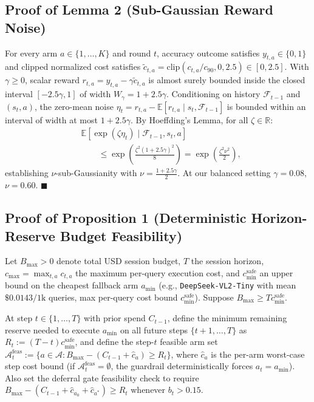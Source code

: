 \documentclass[10pt,twocolumn,letterpaper]{article}
\begin{document}
\subsection{Proof of Lemma 2 (Sub-Gaussian Reward Noise)}
For every arm $a \in \{1,\dots,K\}$ and round $t$, accuracy outcome satisfies $y_{t,a} \in \{0,1\}$ and clipped normalized cost satisfies $\tilde{c}_{t,a} = \text{clip}(c_{t,a}/c_{90}, 0, 2.5) \in [0, 2.5]$. With $\gamma \ge 0$, scalar reward $r_{t,a} = y_{t,a} - \gamma \tilde{c}_{t,a}$ is almost surely bounded inside the closed interval $[-2.5\gamma, 1]$ of width $W_\gamma = 1 + 2.5\gamma$. Conditioning on history $\mathcal{F}_{t-1}$ and $(s_t, a)$, the zero-mean noise $\eta_t = r_{t,a} - \mathbb{E}[r_{t,a} \mid s_t, \mathcal{F}_{t-1}]$ is bounded within an interval of width at most $1 + 2.5\gamma$. By Hoeffding's Lemma, for all $\zeta \in \mathbb{R}$:
\begin{align*}
&\mathbb{E}\left[\exp(\zeta \eta_t) \mid \mathcal{F}_{t-1}, s_t, a\right] \\
&\qquad \le \exp\!\left(\frac{\zeta^2 (1 + 2.5\gamma)^2}{8}\right) = \exp\!\left(\frac{\zeta^2 \nu^2}{2}\right),
\end{align*}
establishing $\nu$-sub-Gaussianity with $\nu = \frac{1 + 2.5\gamma}{2}$. At our balanced setting $\gamma{=}0.08$, $\nu = 0.60$. \hfill $\blacksquare$

\subsection{Proof of Proposition 1 (Deterministic Horizon-Reserve Budget Feasibility)}
Let $B_{\max} > 0$ denote total USD session budget, $T$ the session horizon, $c_{\max} = \max_{t,a} c_{t,a}$ the maximum per-query execution cost, and $c_{\min}^{\text{safe}}$ an upper bound on the cheapest fallback arm $a_{\min}$ (e.g., \texttt{DeepSeek-VL2-Tiny} with mean $\$0.0143/1\text{k}$ queries, max per-query cost bound $c_{\min}^{\text{safe}}$). Suppose $B_{\max} \ge T c_{\min}^{\text{safe}}$.

At step $t \in \{1,\dots,T\}$ with prior spend $C_{t-1}$, define the minimum remaining reserve needed to execute $a_{\min}$ on all future steps $\{t+1,\dots,T\}$ as $R_{t} := (T - t) c_{\min}^{\text{safe}}$, and define the step-$t$ feasible arm set $\mathcal{A}_t^{\text{feas}} := \{a \in \mathcal{A} : B_{\max} - (C_{t-1} + \hat{c}_a) \ge R_t\}$, where $\hat{c}_a$ is the per-arm worst-case step cost bound (if $\mathcal{A}_t^{\text{feas}} = \emptyset$, the guardrail deterministically forces $a_t = a_{\min}$). Also set the deferral gate feasibility check to require $B_{\max} - (C_{t-1} + \hat{c}_{a_0} + \hat{c}_{a^*}) \ge R_t$ whenever $b_t > 0.15$.
\end{document}
